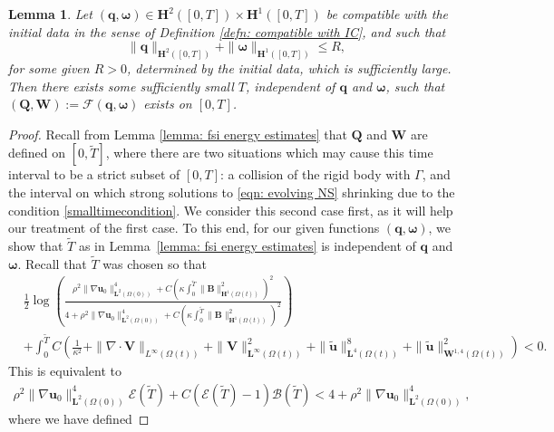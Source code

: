 \documentclass[a4paper]{amsart}
\numberwithin{equation}{section}
\newcommand{\grad}{\nabla}
\newcommand{\Div}{\nabla \cdot}
\theoremstyle{plain}
\newtheorem{lemma}[theorem]{Lemma}
\newcommand{\mbf}[1]{\mathbf{#1}}
\begin{document}
\begin{lemma}
	\label{lemma: non degeneracy1}
    Let $(\mbf{q}, \boldsymbol{\omega}) \in \mbf{H}^2([0,T]) \times \mbf{H}^1([0,T])$ be compatible with the initial data in the sense of Definition \ref{defn: compatible with IC}, and such that
    \[ \|\mbf{q}\|_{\mbf{H}^2([0,T])} + \|\boldsymbol{\omega}\|_{\mbf{H}^1([0,T])} \leq R, \]
    for some given $R > 0$, determined by the initial data, which is sufficiently large.
    Then there exists some sufficiently small $T$, independent of $\mbf{q}$ and $\boldsymbol{\omega}$, such that $(\mbf{Q}, \mbf{W}) := \mathscr{F}(\mbf{q}, \boldsymbol{\omega})$ exists on $[0,T]$.
\end{lemma}
\begin{proof}
    Recall from Lemma \ref{lemma: fsi energy estimates} that $\mbf{Q}$ and $\mbf{W}$ are defined on $[0,\widetilde{T}]$, where there are two situations which may cause this time interval to be a strict subset of $[0,T]$: a collision of the rigid body with $\Gamma$, and the interval on which strong solutions to \eqref{eqn: evolving NS} shrinking due to the condition \eqref{smalltimecondition}.
	We consider this second case first, as it will help our treatment of the first case.
	To this end, for our given functions $(\mbf{q}, \boldsymbol{\omega})$, we show that $\widetilde{T}$ as in Lemma~\ref{lemma: fsi energy estimates} is independent of $\mbf{q}$ and $\boldsymbol{\omega}$.
    Recall that $\widetilde{T}$ was chosen so that
	\begin{align*}
		&\frac{1}{2} \log \left( \frac{\rho^2 \|\grad \mbf{u}_0\|_{\mbf{L}^2(\Omega(0))}^4 + C\left(\kappa \int_0^{\widetilde{T}} \|\mbf{B}\|_{\mbf{H}^1(\Omega(t))}^2 \right)^2}{4 + \rho^2 \|\grad \mbf{u}_0\|_{\mbf{L}^2(\Omega(0))}^4 + C\left(\kappa\int_0^{\widetilde{T}} \|\mbf{B}\|_{\mbf{H}^1(\Omega(t))}^2 \right)^2} \right)\\
        &+\int_0^{\widetilde{T}}C \left(\frac{1}{\kappa^2} + \|\Div\mbf{V}\|_{L^\infty(\Omega(t))} + \|\mbf{V}\|_{\mbf{L}^\infty(\Omega(t))}^2 +\|\widetilde{\mbf{u}}\|_{\mbf{L}^4(\Omega(t))}^8 +\|\widetilde{\mbf{u}}\|_{\mbf{W}^{1,4}(\Omega(t))}^2\right)< 0.
	\end{align*}
	This is equivalent to
	\begin{align}
		\rho^2 \| \grad \mbf{u}_0\|_{\mbf{L}^2(\Omega(0))}^4 \mathcal{E}(\widetilde{T}) + C (\mathcal{E}(\widetilde{T}) -1) \mathcal{B}(\widetilde{T}) < 4 + \rho^2 \| \grad \mbf{u}_0\|_{\mbf{L}^2(\Omega(0))}^4 ,\label{smalltimecondition2}
	\end{align}
    where we have defined

\end{proof}
\end{document}
